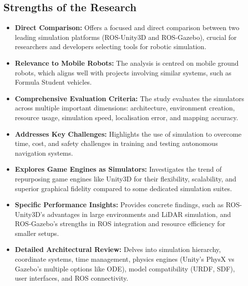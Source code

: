 \subsection{Strengths of the Research}\label{subsec:strengths-of-the-research}
\begin{itemize}
    \item \textbf{Direct Comparison:} Offers a focused and direct comparison between two leading simulation platforms (ROS-Unity3D and ROS-Gazebo), crucial for researchers and developers selecting tools for robotic simulation.
    \item \textbf{Relevance to Mobile Robots:} The analysis is centred on mobile ground robots, which aligns well with projects involving similar systems, such as Formula Student vehicles.
    \item \textbf{Comprehensive Evaluation Criteria:} The study evaluates the simulators across multiple important dimensions: architecture, environment creation, resource usage, simulation speed, localisation error, and mapping accuracy.
    \item \textbf{Addresses Key Challenges:} Highlights the use of simulation to overcome time, cost, and safety challenges in training and testing autonomous navigation systems.
    \item \textbf{Explores Game Engines as Simulators:} Investigates the trend of repurposing game engines like Unity3D for their flexibility, scalability, and superior graphical fidelity compared to some dedicated simulation suites.
    \item \textbf{Specific Performance Insights:} Provides concrete findings, such as ROS-Unity3D's advantages in large environments and LiDAR simulation, and ROS-Gazebo's strengths in ROS integration and resource efficiency for smaller setups.
    \item \textbf{Detailed Architectural Review:} Delves into simulation hierarchy, coordinate systems, time management, physics engines (Unity's PhysX vs Gazebo's multiple options like ODE), model compatibility (URDF, SDF), user interfaces, and ROS connectivity.
\end{itemize}

